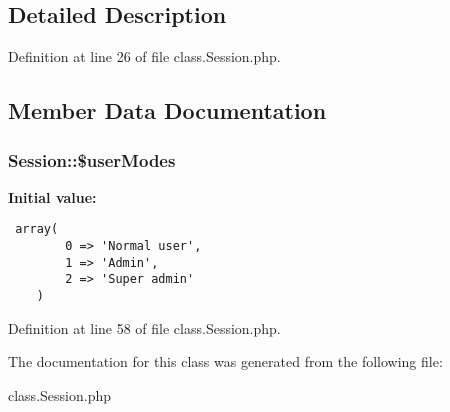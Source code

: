 \subsection{Detailed Description}


Definition at line 26 of file class.Session.php.

\subsection{Member Data Documentation}
\subsubsection{\setlength{\rightskip}{0pt plus 5cm}Session::\$userModes}\label{classSession_b687526fc9a1dabb183b810186f19756}


\textbf{Initial value:}

\begin{Code}\begin{verbatim} array(
        0 => 'Normal user',
        1 => 'Admin',
        2 => 'Super admin'
    )
\end{verbatim}
\end{Code}


Definition at line 58 of file class.Session.php.

The documentation for this class was generated from the following file:\begin{CompactItemize}
\item 
class.Session.php\end{CompactItemize}
